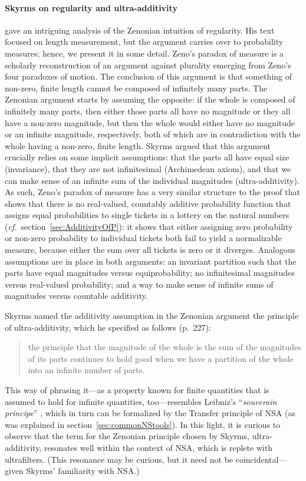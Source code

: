 \paragraph{Skyrms on regularity and ultra-additivity}\label{sec:Zenonian}
\citet{Skyrms:1983a} gave an intriguing analysis of the Zenonian intuition of regularity. His text focused on length measurement, but the argument carries over to probability measures; hence, we present it in some detail. Zeno's paradox of measure is a scholarly reconstruction of an argument against plurality emerging from Zeno's four paradoxes of motion. The conclusion of this argument is that something of non-zero, finite length cannot be composed of infinitely many parts. The Zenonian argument starts by assuming the opposite: if the whole is composed of infinitely many parts, then either those parts all have no magnitude or they all have a non-zero magnitude, but then the whole would either have no magnitude or an infinite magnitude, respectively, both of which are in contradiction with the whole having a non-zero, finite length.
Skyrms argued that this argument crucially relies on some implicit assumptions: that the parts all have equal size (invariance), that they are not infinitesimal (Archimedean axiom), and that we can make sense of an infinite sum of the individual magnitudes (ultra-additivity).
As such, Zeno's paradox of measure has a very similar structure to the proof that shows that there is no real-valued, countably additive probability function that assigns equal probabilities to single tickets in a lottery on the natural numbers (\textit{cf.}\ section~\ref{sec:AdditivityOfP}): it shows that either assigning zero probability or non-zero probability to individual tickets both fail to yield a normalizable measure, because either the sum over all tickets is zero or it diverges. Analogous assumptions are in place in both arguments: an invariant partition such that the parts have equal magnitudes versus equiprobability; no infinitesimal magnitudes versus real-valued probability; and a way to make sense of infinite sums of magnitudes versus countable additivity.

Skyrms named the additivity assumption in the Zenonian argument the principle of ultra-additivity, which he specified as follows (p.~227):
\begin{quote}
the principle that the magnitude of the whole is the sum of the magnitudes of its parts continues to hold good when we have a partition of the whole into an infinite number of parts.
\end{quote}
This way of phrasing it---as a property known for finite quantities that is assumed to hold for infinite quantities, too---resembles Leibniz's ``\textit{souverain principe}'' \citep[see][section~4.3]{KatzSherry:2012a}, which in turn can be formalized by the Transfer principle of NSA (as was explained in section~\ref{sec:commonNStools}). In this light, it is curious to observe that the term for the Zenonian principle chosen by Skyrms, ultra-additivity, resonates well within the context of NSA, which is replete with ultrafilters. (This resonance may be curious, but it need not be coincidental---given Skyrms' familiarity with NSA.)

